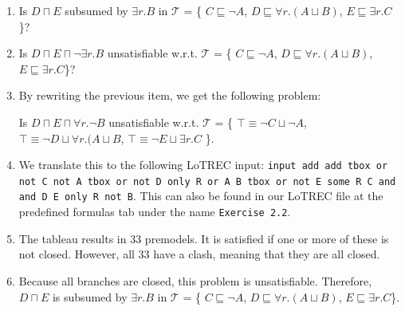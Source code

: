 \documentclass[11pt]{article} %
\begin{document}
\begin{enumerate}
\item Is $D \sqcap E$ subsumed by $\exists r.B$ in $\mathcal{T}$ = \{ $C \sqsubseteq \neg A$, $D \sqsubseteq \forall r.(A \sqcup B)$, $E \sqsubseteq \exists r.C$\}?
\item Is $D \sqcap E \sqcap \neg \exists r.B$ unsatisfiable w.r.t. $\mathcal{T}$ = \{ $C \sqsubseteq \neg A$, $D \sqsubseteq \forall r.(A \sqcup B)$, $E \sqsubseteq \exists r.C$\}?
\item By rewriting the previous item, we get the following problem:

Is $D \sqcap E \sqcap \forall r.\neg B$ unsatisfiable w.r.t. $\mathcal{T}$ = \{ $\top \equiv \neg C \sqcup \neg A$, $\top \equiv \neg D \sqcup \forall r.(A \sqcup B$, $\top \equiv \neg E \sqcup \exists r.C$ \}. 
\item We translate this to the following LoTREC input: \texttt{input add add tbox or not C not A tbox or not D only R or A B tbox or not E some R C and and D E only R not B}. This can also be found in our LoTREC file at the predefined formulas tab under the name \texttt{Exercise 2.2}.
\item The tableau results in 33 premodels. It is satisfied if one or more of these is not closed. However, all 33 have a clash, meaning that they are all closed.
\item Because all branches are closed, this problem is unsatisfiable. Therefore, $D \sqcap E$ is subsumed by $\exists r.B$ in $\mathcal{T}$ = \{ $C \sqsubseteq \neg A$, $D \sqsubseteq \forall r.(A \sqcup B)$, $E \sqsubseteq \exists r.C$\}.
\end{enumerate}
\end{document}

